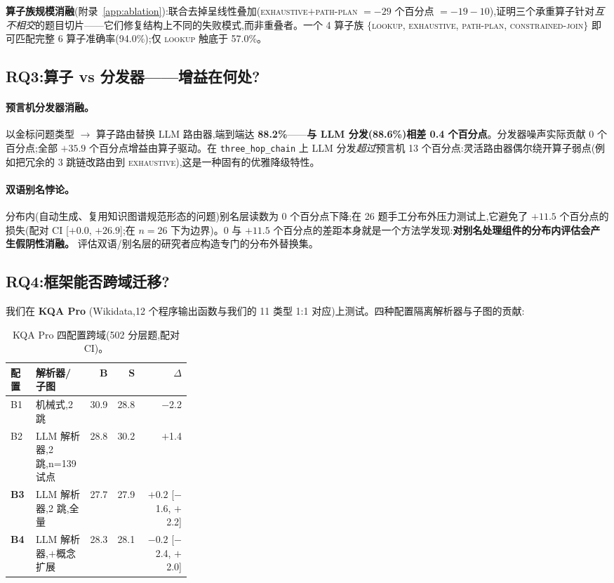 \documentclass[11pt,a4paper]{article}
\newcommand{\qtype}[1]{\texttt{\small #1}}
\newcommand{\op}[1]{\textsc{\small #1}}
\begin{document}
\textbf{算子族规模消融}(附录~\ref{app:ablation}):联合去掉呈线性叠加(\op{exhaustive}$+$\op{path-plan} $= -29$ 个百分点 $= -19{-}10$),证明三个承重算子针对\emph{互不相交}的题目切片——它们修复结构上不同的失败模式,而非重叠者。一个 4 算子族 $\{$\op{lookup}, \op{exhaustive}, \op{path-plan}, \op{constrained-join}$\}$ 即可匹配完整 6 算子准确率(94.0\%);仅 \op{lookup} 触底于 57.0\%。

\subsection{RQ3:算子 vs 分发器——增益在何处?}
\label{sec:rq3}

\paragraph{预言机分发器消融。}
以金标问题类型 $\to$ 算子路由替换 LLM 路由器,端到端达 \textbf{88.2\%}——\textbf{与 LLM 分发(88.6\%)相差 0.4 个百分点}。分发器噪声实际贡献 0 个百分点;全部 $+35.9$ 个百分点增益由算子驱动。在 \qtype{three\_hop\_chain} 上 LLM 分发\emph{超过}预言机 13 个百分点:灵活路由器偶尔绕开算子弱点(例如把冗余的 3 跳链改路由到 \op{exhaustive}),这是一种固有的优雅降级特性。

\paragraph{双语别名悖论。}
分布内(自动生成、复用知识图谱规范形态的问题)别名层读数为 0 个百分点下降;在 26 题手工分布外压力测试上,它避免了 $+11.5$ 个百分点的损失(配对 CI [$+0.0$, $+26.9$];在 $n\!=\!26$ 下为边界)。0 与 $+11.5$ 个百分点的差距本身就是一个方法学发现:\textbf{对别名处理组件的分布内评估会产生假阴性消融。} 评估双语/别名层的研究者应构造专门的分布外替换集。

\subsection{RQ4:框架能否跨域迁移?}
\label{sec:rq4}

我们在 \textbf{KQA Pro} \citep{cao2022kqapro}(Wikidata,12 个程序输出函数与我们的 11 类型 1:1 对应)上测试。四种配置隔离解析器与子图的贡献:

\begin{table}[h]
\centering\small
\caption{KQA Pro 四配置跨域(502 分层题,配对 CI)。}
\label{tab:kqapro}
\begin{tabular}{l p{0.30\linewidth} r r r}
\toprule
\textbf{配置} & \textbf{解析器/子图} & \textbf{B} & \textbf{S} & \textbf{$\Delta$} \\
\midrule
B1 & 机械式,2 跳  & 30.9 & 28.8 & $-$2.2 \\
B2 & LLM 解析器,2 跳,n=139 试点 & 28.8 & 30.2 & $+$1.4 \\
\textbf{B3} & LLM 解析器,2 跳,全量  & 27.7 & 27.9 & $\mathbf{+0.2}$ [$-$1.6, $+$2.2] \\
\textbf{B4} & LLM 解析器,$+$概念扩展  & 28.3 & 28.1 & $\mathbf{-0.2}$ [$-$2.4, $+$2.0] \\
\bottomrule
\end{tabular}
\end{table}
\end{document}
